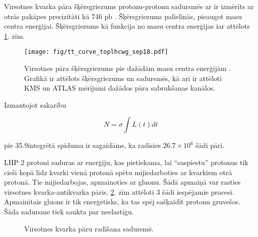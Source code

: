 Virsotnes kvarka pāra šķērsgriezums protonu-protonu sadursmēs ar \TeV ir izmērīts ar \gls{otrās pakāpes} precizitāti kā 746 pb \cite{Khachatryan:2015uqb}. Šķērsgriezums palielinās, pieaugot masu centra enerģijai. Šķērsgriezums kā funkcija no masu centra enerģijas iar attēlots \ref{fig:tt_curve_toplhcwg_sep18}. zīm.

\begin{figure}[hbtp]

  \centering
  \texttt{[image: fig/tt\_curve\_toplhcwg\_sep18.pdf]}
  \caption{Virsotnes pāra šķērsgriezums pie dažādām masu centra enerģijām \cite{twiki:tt_curve_toplhcwg_sep18}. Grafikā ir attēlots šķērsgriezums \Pp\Pp un \Pp\Pap sadursmēs, kā arī ir attēloti KMS un ATLAS mērījumi dažādos \ttbar pāra sabrukšanas kanālos.}
  \label{fig:tt_curve_toplhcwg_sep18}
  
\end{figure}

Izmantojot sakarību

\begin{equation}
N=\sigma\int L(t)dt
\end{equation}

pie 35.9\fbinv integrētā spīduma ir sagaidāms, ka radīsies $26.7\times10^{6}$ šādi pāri. 

LHP 2 protoni saduras ar enerģiju, kas pietiekama, lai ``saspiestu'' protonus tik cieši kopā līdz kvarki vienā protonā spētu mijiedarboties ar kvarkiem otrā protonā. Tie mijiedarbojas, apmainoties ar gluonu. Šādā apmaiņā var rasties virsotnes kvarka-antikvarka pāris. \ref{fig:top_quark_productions}. zīm attēloti 3 šādi iespējamie procesi. Apmainītais gluons ir tik enerģētisks, ka tas spēj sašķaidīt protonu \gls{gruvešos}. Šāda sadursme tiek saukta par neelastīgu.

\begin{figure}[h!]
  \centering
  \def\twidth{0.3}

  \caption{Virsotnes kvarka pāru radīšana \Pp\Pp sadursmē.}
  \label{fig:top_quark_productions}
\end{figure}

